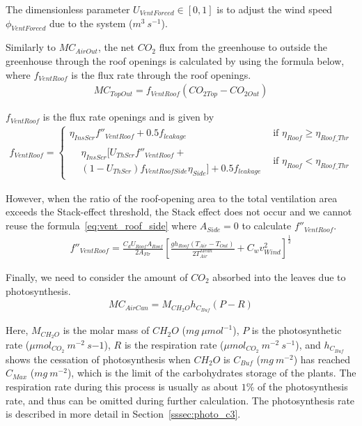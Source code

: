 \documentclass[a4paper]{article}
\numberwithin{equation}{section}
\begin{document}
The dimensionless parameter \(U_{VentForced} \in [0,1]\) is to adjust the wind speed \(\phi_{VentForced}\) due to
the system (\(m^3\ s^{-1}\)).

Similarly to \(MC_{AirOut}\), the net \(CO_2\) flux from the greenhouse to outside the greenhouse through the roof openings is calculated by using the formula below, where \(f_{VentRoof}\) is the flux rate through the roof openings.
\begin{align}
  MC_{TopOut} = f_{VentRoof}(CO_{2 Top} - CO_{2 Out})
\end{align}

\(f_{VentRoof}\) is the flux rate openings and is given by
\begin{gather}
  f_{VentRoof} =
  \begin{cases}
    \eta_{InsScr} f''_{VentRoof} + 0.5f_{leakage} & \text{if~} \eta_{Roof} \geq \eta_{Roof\_Thr} \\
    \begin{split}
      & \eta_{InsScr} [U_{ThScr}f''_{VentRoof} + \\
      & (1-U_{ThScr})f_{VentRoofSide} \eta_{Side}] + 0.5 f_{leakage}
    \end{split}                    & \text{if~}  \eta_{Roof} < \eta_{Roof\_Thr}
  \end{cases}
\end{gather}

However, when the ratio of the roof-opening area to the total ventilation area exceeds the Stack-effect threshold, the Stack effect does not occur and we cannot reuse the formula~\eqref{eq:vent_roof_side} where \(A_{Side} = 0\) to
calculate \(f''_{VentRoof}\).
\begin{align}
  f''_{VentRoof} = \frac{C_d U_{Roof} A_{Roof}}{2A_{Flr}} {\left[\frac{gh_{Roof}(T_{Air} - T_{Out})}{2T^{Mean}_{Air}} + C_w v^2_{Wind}\right]}^{ \frac{1}{2}}
\end{align}

Finally, we need to consider the amount of \(CO_2\) absorbed into the leaves due to photosynthesis.
\begin{align}
  MC_{AirCan} = M_{CH_2O} h_{C_{Buf}} (P - R)
\end{align}

Here, \(M_{CH_2O}\) is the molar mass of \(CH_2O\) (\(mg\ \mu mol^{-1}\)), \(P\) is the photosynthetic rate (\(\mu mol_{CO_2}\ m^{-2}\ s{-1}\)), \(R\) is the respiration rate (\(\mu mol_{CO_2}\ m^{-2}\ s^{-1}\)), and \(h_{C_{Buf}}\) shows the cessation of photosynthesis when \(CH_2O\) is \(C_{Buf}\) (\(mg\ m^{-2}\)) has reached \(C_{Max}\) (\(mg\ m^{-2}\)), which is the limit of the carbohydrates storage of the plants. The respiration rate during this process is usually as about \(1\%\) of the photosynthesis rate, and thus can be omitted during further calculation. The photosynthesis rate is described in more detail in Section~\ref{sssec:photo_c3}.
\end{document}
